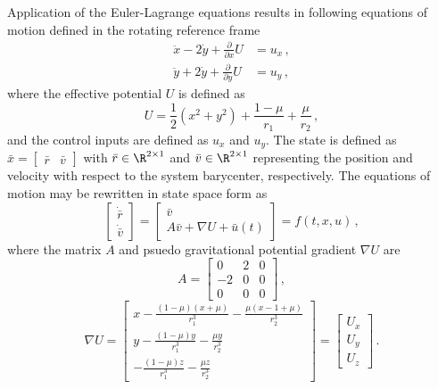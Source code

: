 Application of the Euler-Lagrange equations results in following equations of motion defined in the rotating reference frame
\begin{align}
	\ddot{x} - 2 \dot{y} + \frac{\partial}{\partial x} U &= u_x \, ,\nonumber \\
	\ddot{y} + 2 \dot{y} + \frac{\partial}{\partial y} U &= u_y \, ,
	\label{eq:cont_eom}
\end{align}
where the effective potential \( U\) is defined as
\begin{equation}
	U = \frac{1}{2} \left( x^2 + y^2\right) + \frac{1-\mu}{r_1} + \frac{\mu}{r_2}\, ,
	\label{eq:eff_pot}
\end{equation}
and the control inputs are defined as \( u_x\) and \(u_y\).
The state is defined as \( \bar{x} = \begin{bmatrix}\bar{r} &\bar{v} \end{bmatrix}\) with \(\bar{r} \in \R^{2\times1}\) and \(\bar{v} \in \R^{2\times1}\) representing the position and velocity with respect to the system barycenter, respectively.
The equations of motion may be rewritten in state space form as
\begin{equation}
	\left[\begin{array}{c} \dot{\bar{r}} \\ \dot{\bar{v}} \end{array} \right] = 
	\left[ \begin{array}{c} \bar{v} \\ A \bar{v} + \nabla U + \bar{u}(t) \end{array} \right] = f\left( t,x, u\right) \, ,
\end{equation}
where the matrix \( A \) and psuedo gravitational potential gradient \( \nabla U\) are
\begin{equation}\label{eq:A_mat}
	A = \left[ \begin{array}{ccc} 0 & 2 & 0 \\ -2 & 0 & 0 \\ 0 & 0 & 0 \end{array} \right] \, ,
\end{equation}
\begin{equation} \label{eq:grav_pot}
	\nabla U = \left[ \begin{array}{c} x - \frac{ \left(1 - \mu\right) \left(x + \mu\right)}{r_1^3} - \frac{\mu \left( x - 1 + \mu \right)}{r_2^3} \\
											y - \frac{ \left(1 - \mu\right) y}{r_1^3} - \frac{\mu y}{r_2^3} \\
											- \frac{ \left(1 - \mu\right) z}{r_1^3} - \frac{\mu z}{r_2^3}\end{array}\right]
					= \left[\begin{array}{c} U_x \\ U_y \\ U_z\end{array} \right] \, .
\end{equation}


